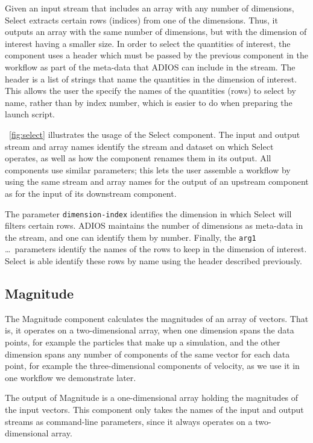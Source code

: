 Given an input stream that includes an array with
any number of dimensions,
Select extracts certain rows (indices) from one of
the dimensions.
Thus, it outputs an array
with the same number of dimensions,
but with the dimension of interest having a
smaller size. In order to select the quantities of
interest, the component uses a header which
must be passed by the previous component in the
workflow as part of the meta-data that ADIOS
can include in the stream.
The header is a list of strings that
name the quantities in the
dimension of interest.
This allows the user the specify
the names of the quantities (rows)
to select by name, rather than by index number,
which is easier to do when preparing the launch script.

~\autoref{fig:select} illustrates the usage
of the Select component. 
The input and output stream and array names
identify the stream and dataset on
which Select operates, as well as how
the component renames them in its output.
All components use similar parameters; this lets
the user assemble a workflow by
using the same stream and array names
for the output of an upstream component
as for the input of its downstream component.

The parameter \texttt{dimension-index} identifies
the dimension in which Select will filters
certain rows. ADIOS maintains the number of dimensions
as meta-data in the stream, and one can identify them
by number. Finally, the \texttt{arg1} \ldots \ parameters 
identify the names of the rows to keep in the dimension
of interest. Select is able identify these rows
by name using the header described previously.

\subsection{Magnitude}

The Magnitude component calculates the magnitudes
of an array of vectors. That is, it operates
on a two-dimensional array, when one dimension spans
the data points, for example the particles that
make up a simulation, and the other dimension spans any number
of components of the same vector for each data point, for example
the three-dimensional components of velocity,
as we use it in one workflow we demonstrate later.

The output of Magnitude is a one-dimensional array holding
the magnitudes of the input vectors. This \sys component
only takes the names of the input and output streams
as command-line parameters, since it always
operates on a two-dimensional array.

